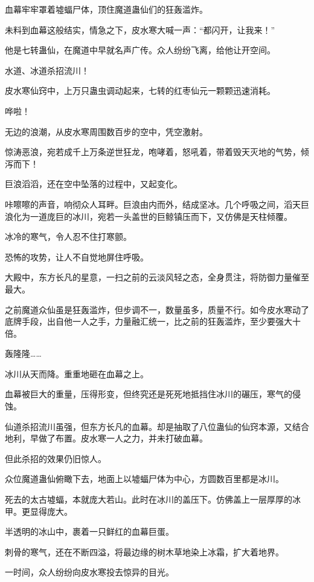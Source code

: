 
\begin{this_body}

血幕牢牢罩着墟蝠尸体，顶住魔道蛊仙们的狂轰滥炸。

未料到血幕这般结实，情急之下，皮水寒大喊一声：“都闪开，让我来！”

他是七转蛊仙，在魔道中早就名声广传。众人纷纷飞离，给他让开空间。

水道、冰道杀招流川！

皮水寒仙窍中，上万只蛊虫调动起来，七转的红枣仙元一颗颗迅速消耗。

哗啦！

无边的浪潮，从皮水寒周围数百步的空中，凭空激射。

惊涛恶浪，宛若成千上万条逆世狂龙，咆哮着，怒吼着，带着毁天灭地的气势，倾泻而下！

巨浪滔滔，还在空中坠落的过程中，又起变化。

咔嚓嚓的声音，响彻众人耳畔。巨浪由内而外，结成坚冰。几个呼吸之间，滔天巨浪化为一道庞巨的冰川，宛若一头盖世的巨鲸镇压而下，又仿佛是天柱倾覆。

冰冷的寒气，令人忍不住打寒颤。

恐怖的攻势，让人不自觉地屏住呼吸。

大殿中，东方长凡的星意，一扫之前的云淡风轻之态，全身贯注，将防御力量催至最大。

之前魔道众仙虽是狂轰滥炸，但步调不一，数量虽多，质量不行。如今皮水寒动了底牌手段，出自他一人之手，力量融汇统一，比之前的狂轰滥炸，至少要强大十倍。

轰隆隆……

冰川从天而降。重重地砸在血幕之上。

血幕被巨大的重量，压得形变，但终究还是死死地抵挡住冰川的碾压，寒气的侵蚀。

仙道杀招流川虽强，但东方长凡的血幕。却是抽取了八位蛊仙的仙窍本源，又结合地利，早做了布置。皮水寒一人之力，并未打破血幕。

但此杀招的效果仍旧惊人。

众位魔道蛊仙俯瞰下去，地面上以墟蝠尸体为中心，方圆数百里都是冰川。

死去的太古墟蝠，本就庞大若山。此时在冰川的盖压下。仿佛盖上一层厚厚的冰甲。更显得庞大。

半透明的冰山中，裹着一只鲜红的血幕巨蛋。

刺骨的寒气，还在不断四溢，将最边缘的树木草地染上冰霜，扩大着地界。

一时间，众人纷纷向皮水寒投去惊异的目光。


\end{this_body}
